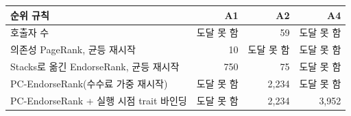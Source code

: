 \begin{tabular}{@{}lrrr@{}}
\toprule
순위 규칙 & A1 & A2 & A4 \\
\midrule
호출자 수 & 도달 못 함 & 59 & 도달 못 함 \\
의존성 PageRank, 균등 재시작 & 10 & 도달 못 함 & 도달 못 함 \\
Stacks로 옮긴 EndorseRank, 균등 재시작 & 750 & 75 & 도달 못 함 \\
PC-EndorseRank(수수료 가중 재시작) & 도달 못 함 & 2,234 & 도달 못 함 \\
PC-EndorseRank + 실행 시점 trait 바인딩 & 도달 못 함 & 2,234 & 3,952 \\
\bottomrule
\end{tabular}
